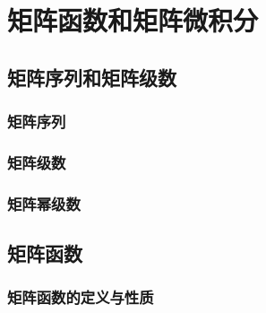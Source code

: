 \chapter{矩阵函数和矩阵微积分}
\label{cha:矩阵函数和矩阵微积分}

\section{矩阵序列和矩阵级数}
\label{sec:矩阵序列和矩阵级数}

\subsection{矩阵序列}
\label{sub:矩阵序列}

\begin{definition}[]
\end{definition}

\begin{definition}[]
\end{definition}

\begin{definition}[]
\end{definition}

\begin{definition}[]
\end{definition}

\subsection{矩阵级数}
\label{sub:矩阵级数}

\begin{definition}[]
\end{definition}

\begin{definition}[]
\end{definition}

\subsection{矩阵幂级数}
\label{sub:矩阵幂级数}

\section{矩阵函数}
\label{sec:矩阵函数}

\subsection{矩阵函数的定义与性质}
\label{sub:矩阵函数的定义与性质}

